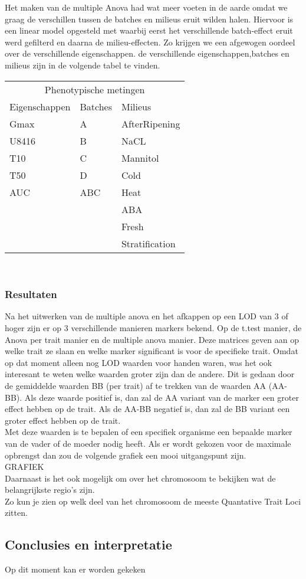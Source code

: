 \documentclass[12pt,a4paper, twocolumn]{article}
\begin{document}
Het maken van de multiple Anova had wat meer voeten in de aarde omdat we graag de verschillen tussen de batches en milieus eruit wilden halen.
Hiervoor is een linear model opgesteld met waarbij eerst het verschillende batch-effect eruit werd gefilterd en daarna de milieu-effecten.
Zo krijgen we een afgewogen oordeel over de verschillende eigenschappen.
de verschillende eigenschappen,batches en milieus zijn in de volgende tabel te vinden.\\

\begin{tabular} {l  l  l}
\multicolumn{3}{c}{Phenotypische metingen} \\
Eigenschappen & Batches & Milieus\\ 
\hline 
Gmax & A & AfterRipening\\
U8416 & B & NaCL\\
T10 & C & Mannitol\\
T50 & D & Cold\\
AUC & ABC & Heat\\
 &  & ABA\\
 &  & Fresh\\
 &  & Stratification\\
\end{tabular}\\
\subsubsection*{Resultaten}
Na het uitwerken van de multiple anova en het afkappen op een LOD van 3 of hoger zijn er op 3 verschillende manieren markers bekend. 
Op de t.test manier, de Anova per trait manier en de multiple anova manier. 
Deze matrices geven aan op welke trait ze slaan en welke marker significant is voor de specifieke trait.
Omdat  op dat moment alleen nog LOD waarden voor handen waren, was het ook interesant te weten welke waarden groter zijn dan de andere. 
Dit is gedaan door de gemiddelde waarden BB (per trait) af te trekken van de waarden AA (AA-BB).
Als deze waarde positief is, dan zal de AA variant van de marker een groter effect hebben op de trait. 
Als de AA-BB negatief is, dan zal de BB variant een groter effect hebben op de trait. \\
Met deze waarden is te bepalen of een specifiek organisme een bepaalde marker van de vader of de moeder nodig heeft.
Als er wordt gekozen voor de maximale opbrengst dan zou de volgende grafiek een mooi uitgangspunt zijn.\\
GRAFIEK\\
Daarnaast is het ook mogelijk om over het chromosoom te bekijken wat de belangrijkste regio's zijn.\\
Zo kun je zien op welk deel van het chromosoom de meeste Quantative Trait Loci zitten.
\subsection*{Conclusies en interpretatie}
Op dit moment kan er worden gekeken 
\end{document}
